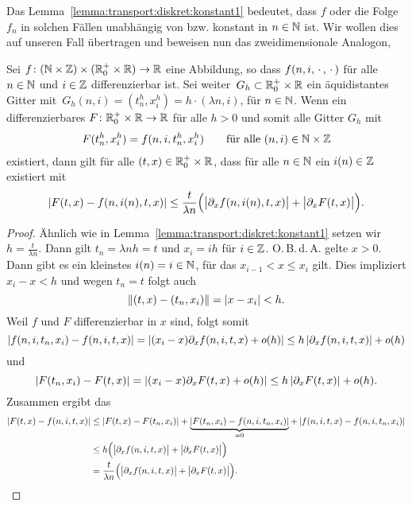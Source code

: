 Das Lemma~\ref{lemma:transport:diskret:konstant1} bedeutet, dass $f$ oder die Folge $f_n$ in solchen Fällen unabhängig von bzw. konstant in $n \in \mathbb N$ ist.
Wir wollen dies auf unseren Fall übertragen und beweisen nun das zweidimensionale Analogon, 
\\

\begin{lemma}\label{lemma:transport:diskret:konvergenz_gitter}
Sei $f\colon (\mathbb N \times \mathbb Z) \times (\mathbb R^+_0 \times \mathbb R) \to \mathbb R$ eine Abbildung, so dass $f(n,i,\, \cdot \,,\, \cdot \,)$ für alle $n \in \mathbb N$ und $i \in \mathbb Z$ differenzierbar ist.
Sei weiter\, $G_h \subset \mathbb R^+_0 \times \mathbb R$ ein äquidistantes Gitter mit\, $G_h(n,i) = (t^h_n, x^h_i) = h \cdot (\lambda n, i)$, für $n \in \mathbb N$.
Wenn ein differenzierbares $F\colon \mathbb R^+_0 \times \mathbb R \to \mathbb R$ für alle $h > 0$ und somit alle Gitter $G_h$ mit
\begin{align}\label{eq:lemma:diag:voraussetzung}
F(t^h_n, x^h_i) = f(n, i, t^h_n, x^h_i) \qquad \text{für alle $(n,i) \in \mathbb N \times \mathbb Z$}
\end{align}
existiert, dann gilt für alle $(t, x) \in \mathbb R^+_0 \times \mathbb R$, dass für alle $n \in \mathbb N$ ein $i(n) \in \mathbb Z$ existiert mit
\begin{align}\label{eq:lemma:diag:aussage}
\left| F(t, x) - f(n, i(n), t, x) \right| \leq \frac {t}{\lambda n} \Bigl(\bigl\lvert \partial_x f(n, i(n), t, x) \bigr\rvert + \bigl\lvert \partial_x F(t, x) \bigr\rvert \Bigr).
\end{align}
\end{lemma}
\begin{proof}
Ähnlich wie in Lemma~\ref{lemma:transport:diskret:konstant1} setzen wir $h = \frac {t}{\lambda n}$.
Dann gilt $t_n = \lambda n h = t$ und $x_i = i h$ für $i \in \mathbb Z$.
O.\,B.\,d.\,A. gelte $x > 0$.
Dann gibt es ein kleinstes $i(n) = i \in \mathbb N$, für das $x_{i-1} < x \leq x_i$ gilt.
Dies impliziert $x_i - x < h$ und wegen $t_n = t$ folgt auch
\[ \left\lVert (t,x) - (t_n, x_i) \right\rVert = \left| x - x_i \right| < h. \]
Weil $f$ und $F$ differenzierbar in $x$ sind, folgt somit
\[ \left| f(n, i, t_n, x_i) - f(n, i, t, x) \right| = \left| (x_i - x) \partial_x f(n, i, t, x) + o(h) \right| \leq h \left| \partial_x f(n, i, t, x) \right| + o(h) \]
und
\[ \left| F(t_n, x_i) - F(t, x) \right| = \left| (x_i - x) \partial_x F(t, x) + o(h) \right| \leq h \left| \partial_x F(t, x) \right| + o(h). \]
Zusammen ergibt das
{\small
\begin{align*}
\left| F(t,x) - f(n, i, t, x) \right| &\leq \left| F(t, x) - F(t_n, x_i) \right| + \underbrace{\left| F(t_n, x_i) - f(n, i, t_n, x_i) \right|}_{= 0} + \left| f(n,i, t, x) - f(n, i, t_n, x_i) \right|\\
&\leq h \Bigl(\bigl\lvert \partial_x f(n, i, t, x) \bigr\rvert + \bigl\lvert \partial_x F(t, x) \bigr\rvert \Bigr)\\
&= \frac {t}{\lambda n} \Bigl(\bigl\lvert \partial_x f(n, i, t, x) \bigr\rvert + \bigl\lvert \partial_x F(t, x) \bigr\rvert \Bigr). \qedhere
\end{align*}
}
\end{proof}
